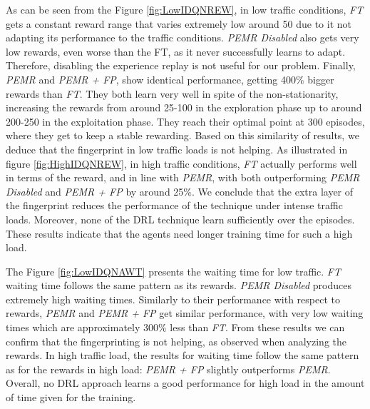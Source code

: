 \documentclass{llncs}
\begin{document}
As can be seen from the Figure \ref{fig:LowIDQNREW}, in low traffic conditions, \textit{FT} gets a constant reward range that varies extremely low around 50 due to it not adapting its performance to the traffic conditions. \textit{PEMR Disabled} also gets very low rewards, even worse than the FT, as it never successfully learns to adapt. Therefore, disabling the experience replay is not useful for our problem. Finally, \textit{PEMR} and \textit{PEMR + FP}, show identical performance, getting 400$\%$ bigger rewards than \textit{FT}. They both learn very well in spite of the non-stationarity, increasing the rewards from around 25-100 in the exploration phase up to around 200-250 in the exploitation phase. They reach their optimal point at 300 episodes, where they get to keep a stable rewarding. Based on this similarity of results, we deduce that the fingerprint in low traffic loads is not helping.
As illustrated in figure \ref{fig:HighIDQNREW}, in high traffic conditions, \textit{FT} actually performs well in terms of the reward, and in line with \textit{PEMR}, with both outperforming \textit{PEMR Disabled} and \textit{PEMR + FP} by around 25$\%$. We conclude that the extra layer of the fingerprint reduces the performance of the technique under intense traffic loads. Moreover, none of the DRL technique learn sufficiently over the episodes. These results indicate that the agents need longer training time for such a high load. 

The Figure \ref{fig:LowIDQNAWT} presents the waiting time for low traffic. \textit{FT} waiting time follows the same pattern as its rewards. \textit{PEMR Disabled} produces extremely high waiting times. Similarly to their performance with respect to rewards, \textit{PEMR} and \textit{PEMR + FP} get similar performance, with very low waiting times which are approximately 300$\%$ less than \textit{FT}. From these results we can confirm that the fingerprinting is not helping, as observed when analyzing the rewards. In high traffic load, the results for waiting time follow the same pattern as for the rewards in high load: \textit{PEMR + FP} slightly outperforms \textit{PEMR}. Overall, no DRL approach learns a good performance for high load in the amount of time given for the training.
\end{document}
